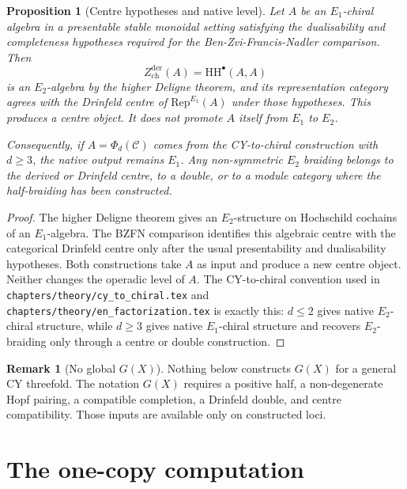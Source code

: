 \documentclass[11pt]{amsart}
\newtheorem{proposition}[theorem]{Proposition}
\theoremstyle{definition}
\newtheorem{remark}[theorem]{Remark}
\providecommand{\HH}{\mathrm{HH}}
\providecommand{\Rep}{\mathrm{Rep}}
\begin{document}
\begin{proposition}[Centre hypotheses and native level]
\label{prop:centre-scope}
Let \(A\) be an \(E_1\)-chiral algebra in a presentable stable
monoidal setting satisfying the dualisability and completeness
hypotheses required for the Ben-Zvi-Francis-Nadler comparison. Then
\[
  Z_{\mathrm{ch}}^{\mathrm{der}}(A)=\HH^\bullet(A,A)
\]
is an \(E_2\)-algebra by the higher Deligne theorem, and its
representation category agrees with the Drinfeld centre of
\(\Rep^{E_1}(A)\) under those hypotheses. This produces a centre
object. It does not promote \(A\) itself from \(E_1\) to \(E_2\).

Consequently, if \(A=\Phi_d(\mathcal C)\) comes from the CY-to-chiral
construction with \(d\geq3\), the native output remains \(E_1\). Any
non-symmetric \(E_2\) braiding belongs to the derived or Drinfeld
centre, to a double, or to a module category where the half-braiding
has been constructed.
\end{proposition}

\begin{proof}
The higher Deligne theorem gives an \(E_2\)-structure on Hochschild
cochains of an \(E_1\)-algebra. The BZFN comparison identifies this
algebraic centre with the categorical Drinfeld centre only after the
usual presentability and dualisability hypotheses. Both constructions
take \(A\) as input and produce a new centre object. Neither changes
the operadic level of \(A\). The CY-to-chiral convention used in
\texttt{chapters/theory/cy\_to\_chiral.tex} and
\texttt{chapters/theory/en\_factorization.tex} is exactly this:
\(d\leq2\) gives native \(E_2\)-chiral structure, while \(d\geq3\)
gives native \(E_1\)-chiral structure and recovers \(E_2\)-braiding
only through a centre or double construction.
\end{proof}

\begin{remark}[No global \(G(X)\)]
Nothing below constructs \(G(X)\) for a general CY threefold. The
notation \(G(X)\) requires a positive half, a non-degenerate Hopf
pairing, a compatible completion, a Drinfeld double, and centre
compatibility. Those inputs are available only on constructed loci.
\end{remark}

\section{The one-copy computation}
\end{document}
